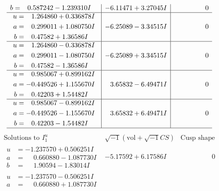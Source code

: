 \documentclass[1p]{elsarticle_modified}
\theoremstyle{definition}
\newcommand{\I}{\sqrt{-1}}
\begin{document}
$$\begin{array}{c|c|c}
\begin{aligned}
b &= \phantom{-}0.587242 - 1.239310 I\end{aligned}
 & -6.11471 + 3.27045 I & \phantom{-0.000000 } 0 \\ \hline\begin{aligned}
u &= \phantom{-}1.264860 + 0.336878 I \\
a &= \phantom{-}0.299011 + 1.080750 I \\
b &= \phantom{-}0.47582 + 1.36586 I\end{aligned}
 & -6.25089 - 3.34515 I & \phantom{-0.000000 } 0 \\ \hline\begin{aligned}
u &= \phantom{-}1.264860 - 0.336878 I \\
a &= \phantom{-}0.299011 - 1.080750 I \\
b &= \phantom{-}0.47582 - 1.36586 I\end{aligned}
 & -6.25089 + 3.34515 I & \phantom{-0.000000 } 0 \\ \hline\begin{aligned}
u &= \phantom{-}0.985067 + 0.899162 I \\
a &= -0.449526 + 1.155670 I \\
b &= \phantom{-}0.42203 + 1.54482 I\end{aligned}
 & \phantom{-}3.65832 - 6.49471 I & \phantom{-0.000000 } 0 \\ \hline\begin{aligned}
u &= \phantom{-}0.985067 - 0.899162 I \\
a &= -0.449526 - 1.155670 I \\
b &= \phantom{-}0.42203 - 1.54482 I\end{aligned}
 & \phantom{-}3.65832 + 6.49471 I & \phantom{-0.000000 } 0\\
 \hline 
 \end{array}$$\newpage$$\begin{array}{c|c|c}  
\text{Solutions to }I^u_{1}& \I (\text{vol} + \sqrt{-1}CS) & \text{Cusp shape}\\
 \hline 
\begin{aligned}
u &= -1.237570 + 0.506251 I \\
a &= \phantom{-}0.660880 - 1.087730 I \\
b &= \phantom{-}1.90594 - 1.83014 I\end{aligned}
 & -5.17592 + 6.17586 I & \phantom{-0.000000 } 0 \\ \hline\begin{aligned}
u &= -1.237570 - 0.506251 I \\
a &= \phantom{-}0.660880 + 1.087730 I \\

\end{aligned}
\end{array}$$
\end{document}
